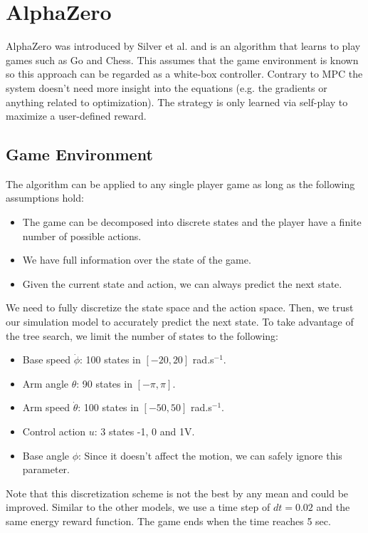\documentclass{LTHtwocol} %
\begin{document}
\section{AlphaZero}

AlphaZero was introduced by Silver et al. \cite{10.1038/nature24270} and is an algorithm that learns to play games such as Go and Chess. This assumes that the game environment is known so this approach can be regarded as a white-box controller. Contrary to MPC the system doesn't need more insight into the equations (e.g. the gradients or anything related to optimization). The strategy is only learned via self-play to maximize a user-defined reward.

\subsection{Game Environment}

The algorithm can be applied to any single player game as long as the following assumptions hold:
\begin{itemize}
    \item The game can be decomposed into discrete states and the player have a finite number of possible actions.
    \item We have full information over the state of the game.
    \item Given the current state and action, we can always predict the next state.
\end{itemize} 
We need to fully discretize the state space and the action space. Then, we trust our simulation model to accurately predict the next state.
To take advantage of the tree search, we limit the number of states to the following:
\begin{itemize}
    \item Base speed $\dot\phi$: 100 states in $[-20,20]$ rad.s$^{-1}$.
    \item Arm angle $\theta$: 90 states in $[-\pi,\pi]$.
    \item Arm speed $\dot\theta$: 100 states in $[-50,50]$ rad.s$^{-1}$.
    \item Control action $u$: 3 states -1, 0 and 1V.
    \item Base angle $\phi$: Since it doesn't affect the motion, we can safely ignore this parameter.
\end{itemize}
Note that this discretization scheme is not the best by any mean and could be improved. Similar to the other models, we use a time step of $dt=0.02$ and the same energy reward function. The game ends when the time reaches 5 sec.
\end{document}
